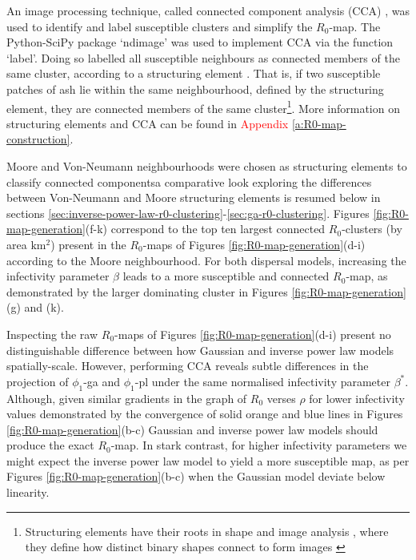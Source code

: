 An image processing technique, called connected component analysis (CCA) \cite{CCA1, CCA2}, was used to identify and label susceptible clusters and simplify the $R_0$-map. 
The Python-SciPy package `ndimage' \cite{scipy} was used to implement CCA via the function `label'. 
Doing so labelled all susceptible neighbours as connected members of the same cluster, according to a structuring element \cite{liang1989erosion}. 
That is, if two susceptible patches of ash lie within the same neighbourhood, defined by the structuring element, they are connected members of the same cluster\footnote{Structuring elements have their roots in shape and image analysis \cite{23111}, where they define how distinct binary shapes connect to form images \cite{liang1989erosion, nachtegael2001connections}}. 
More information on structuring elements and CCA can be found in \textcolor{red}{Appendix \ref{a:R0-map-construction}}. %

Moore and Von-Neumann neighbourhoods were chosen as structuring elements to classify connected components\textemdash a comparative look exploring the differences between Von-Neumann and Moore 
structuring elements is resumed below in sections \ref{sec:inverse-power-law-r0-clustering}-\ref{sec:ga-r0-clustering}.  
Figures \ref{fig:R0-map-generation}(f-k) correspond to the top ten largest connected $R_0$-clusters (by area $\mathrm{km^2}$) present in the $R_0$-maps of Figures \ref{fig:R0-map-generation}(d-i) according to the Moore neighbourhood.
For both dispersal models, increasing the infectivity parameter $\beta$ leads to a more susceptible and connected $R_0$-map, as demonstrated by the larger dominating cluster in Figures \ref{fig:R0-map-generation}(g) and (k).

Inspecting the raw $R_0$-maps of Figures \ref{fig:R0-map-generation}(d-i) present no distinguishable difference between how Gaussian and inverse power law models spatially-scale.
However, performing CCA reveals subtle differences in the projection of $\phi_1$-ga and $\phi_1$-pl under the same normalised infectivity parameter $\beta^*$.
Although, given similar gradients in the graph of $R_0$ verses $\rho$ for lower infectivity values
\textemdash demonstrated by the convergence of solid orange and blue lines in Figures \ref{fig:R0-map-generation}(b-c)\textemdash 
Gaussian and inverse power law models should produce the exact $R_0$-map.
In stark contrast, for higher infectivity parameters we might expect the inverse power law model to yield a more susceptible map, as per Figures \ref{fig:R0-map-generation}(b-c) when the Gaussian model deviate below linearity.

